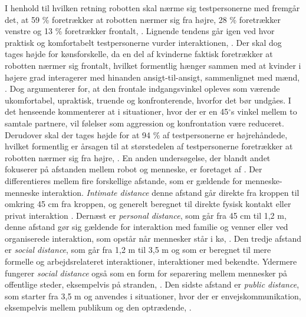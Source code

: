 I henhold til hvilken retning robotten skal nærme sig testpersonerne med fremgår det, at 59 \% foretrækker at robotten nærmer sig fra højre, 28 \% foretrækker venstre og 13 \% foretrækker frontalt, \parencite[s. 175]{PDF:HowMayIServeYou}. Lignende tendens går igen ved hvor praktisk og komfortabelt testpersonerne vurder interaktionen, \parencite[ss. 175-176]{PDF:HowMayIServeYou}. Der skal dog tages højde for kønsforskelle, da en del af kvinderne faktisk foretrækker at robotten nærmer sig frontalt, hvilket formentlig hænger sammen med at kvinder i højere grad interagerer med hinanden ansigt-til-ansigt, sammenlignet med mænd, \parencite[s. 178]{PDF:HowMayIServeYou}. Dog argumenterer \textcite[s. 178]{PDF:HowMayIServeYou} for, at den frontale indgangsvinkel opleves som værende ukomfortabel, upraktisk, truende og konfronterende, hvorfor det bør undgåes. I det henseende kommenterer \textcite[s. 178]{PDF:HowMayIServeYou} at i situationer, hvor der er en 45$^{\circ}$s vinkel mellem to samtale partnere, vil følelser som aggression og konfrontation være reduceret. Derudover skal der tages højde for at 94 \% af testpersonerne er højrehåndede, hvilket formentlig er årsagen til at størstedelen af testpersonerne foretrækker at robotten nærmer sig fra højre, \parencite[s. 175]{PDF:HowMayIServeYou}.\blankline
%
En anden undersøgelse, der blandt andet fokuserer på afstanden mellem robot og menneske, er foretaget af \textcite{PDF:HumanRobotEmodiedInteraction}. Der differentieres mellem fire forskellige afstande, som er gældende for menneske-menneske interaktion. \textit{Intimate distance} denne afstand går direkte fra kroppen til omkring 45 cm fra kroppen, og generelt beregnet til direkte fysisk kontakt eller privat interaktion \parencite[s. 165]{PDF:HumanRobotEmodiedInteraction}. Dernæst er \textit{personal distance}, som går fra 45 cm til 1,2 m, denne afstand gør sig gældende for interaktion med familie og venner eller ved organiserede interaktion, som opstår når mennesker står i kø, \parencite[s. 165]{PDF:HumanRobotEmodiedInteraction}. Den tredje afstand er \textit{social distance}, som går fra 1,2 m til 3,5 m og som er beregnet til mere formelle og arbejdsrelateret interaktioner, interaktioner med bekendte. Ydermere fungerer \textit{social distance} også som en form for separering mellem mennesker på offentlige steder, eksempelvis på stranden, \parencite[s. 165]{PDF:HumanRobotEmodiedInteraction}. Den sidste afstand er \textit{public distance}, som starter fra 3,5 m og anvendes i situationer, hvor der er envejskommunikation, eksempelvis mellem publikum og den optrædende, \parencite[s. 165]{PDF:HumanRobotEmodiedInteraction}.

